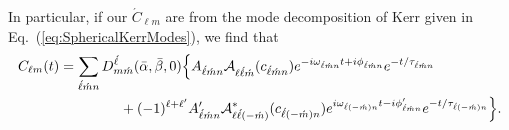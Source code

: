 \documentclass[11pt]{article}
\newcommand{\YSH}[3][]{\mathcal{A}^{#1}_{#2}(#3)}
\begin{document}
In particular, if our $\acute{C}_{\ell m}$ are from the mode decomposition
of Kerr given in Eq.~(\ref{eq:SphericalKerrModes}), we find that
\begin{equation}\label{eq:SphericalRotatedKerrModes}
\begin{aligned}
 C_{\ell{m}}(t) & = \sum_{\acute\ell\acute{m}n}
 D^{\acute\ell}_{m\acute{m}}(\bar\alpha,\bar\beta,0) \Big\{ 
   A_{\acute\ell\acute{m}n}\YSH{\ell\acute\ell\acute{m}}{c_{\acute\ell\acute{m}n}}
    e^{-i\omega_{\acute\ell\acute{m}n}t+i\phi_{\acute\ell\acute{m}n}}e^{-t/\tau_{\acute\ell\acute{m}n}} \\
& {} \hspace{0.6in}
  + (-1)^{\ell+\ell^\prime} A^\prime_{\acute\ell\acute{m}n}
    \YSH[*]{\ell\acute\ell(-\acute{m})}{c_{\acute\ell(-\acute{m})n}}
    e^{i\omega_{\acute\ell(-\acute{m})n}t-i\phi^\prime_{\acute\ell\acute{m}n}}e^{-t/\tau_{\acute\ell(-\acute{m})n}} \Big\}.
\end{aligned}
\end{equation}


\newpage
{}
\vspace{0.25in}
\end{document}
